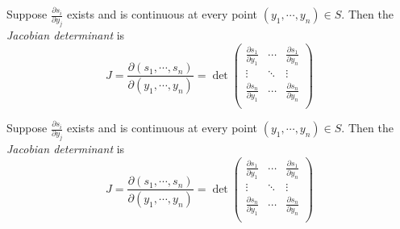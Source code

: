 \begin{note}
  \begin{field}
    \begin{defi}
      Suppose $\frac{\partial s_i}{\partial y_j}$ exists and is continuous at every point $(y_1, \cdots, y_n)\in S$. Then the \emph{Jacobian determinant} is
      \[
        J = \frac{\partial (s_1, \cdots, s_n)}{\partial (y_1, \cdots, y_n)} =
        \det
        \begin{pmatrix}
          \frac{\partial s_1}{\partial y_1} & \cdots & \frac{\partial s_1}{\partial y_n}\\
          \vdots & \ddots & \vdots\\
          \frac{\partial s_n}{\partial y_1} & \cdots & \frac{\partial s_n}{\partial y_n}\\
        \end{pmatrix}
      \]
    \end{defi}
  \end{field}
  \begin{field}
    \begin{defi}
      Suppose $\frac{\partial s_i}{\partial y_j}$ exists and is continuous at every point $(y_1, \cdots, y_n)\in S$. Then the \emph{Jacobian determinant} is
      \[
        J = \frac{\partial (s_1, \cdots, s_n)}{\partial (y_1, \cdots, y_n)} =
        \det
        \begin{pmatrix}
          \frac{\partial s_1}{\partial y_1} & \cdots & \frac{\partial s_1}{\partial y_n}\\
          \vdots & \ddots & \vdots\\
          \frac{\partial s_n}{\partial y_1} & \cdots & \frac{\partial s_n}{\partial y_n}\\
        \end{pmatrix}
      \]
    \end{defi}
  \end{field}
  \xplain{}%
\end{note}

